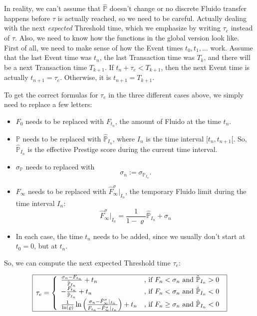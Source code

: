 \documentclass[a4paper,12pt]{scrartcl}
\newcounter{formula}
\begin{document}
In reality, we can't assume that $\hat{\mathbb{P}}$ doesn't change or no discrete Fluido transfer happens before $\tau$ is actually reached, so we need to be careful. Actually dealing with the next \textit{expected} Threshold time, which we emphasize by writing $\tau_e$ instead of $\tau$. Also, we need to know how the functions in the global version look like. First of all, we need to make sense of how the Event times $t_0, t_1, \ldots$ work. Assume that the last Event time was $t_n$, the last Transaction time was $T_k$, and there will be a next Transaction time $T_{k+1}$. If $t_n + \tau_e < T_{k+1}$, then the next Event time is actually $t_{n+1} = \tau_e$. Otherwise, it is $t_{n+1} = T_{k+1}$.

To get the correct formulas for $\tau_e$ in the three different cases above, we simply need to replace a few letters:
\begin{itemize}
 \item $F_0$ needs to be replaced with $F_{t_n}$, the amount of Fluido at the time $t_n$.
 \item $\mathbb{P}$ needs to be replaced with $\hat{\mathbb{P}}_{I_n}$, where $I_n$ is the time interval $[t_n,t_{n+1}[$. So, $\hat{\mathbb{P}}_{I_n}$ is the effective Prestige score during the current time interval.
 \item $\sigma_{\mathbb{P}}$ needs to replaced with
 $$\sigma_n := \sigma_{\mathbb{P}_{I_n}}.$$
 \item $F_{\infty}$ needs to be replaced with $\hat{F}^{\sigma}_{\infty}|_{I_n}$, the temporary Fluido limit during the time interval $I_n$:
 $$\hat{F}^{\sigma}_{\infty}|_{I_n} = \frac{1}{1-\varrho} \hat{\mathbb{P}}_{I_n} + \sigma_n$$
 \item In each case, the time $t_n$ needs to be added, since we usually don't start at $t_0 = 0$, but at $t_n$.
\end{itemize}

So, we can compute the next expected Threshold time $\tau_e$:

$$
\begin{array}{|l|}
\hline
\tau_e = \left\{
\begin{array}{ll}
\frac{\sigma_n - F_{t_n}}{\hat{\mathbb{P}}_{I_n}} + t_n & \mbox{, if } F_n < \sigma_n \mbox{ and } \hat{\mathbb{P}}_{I_n} > 0 \\
-\frac{F_{t_n}}{\hat{\mathbb{P}}_{I_n}} + t_n & \mbox{, if } F_n < \sigma_n \mbox{ and } \hat{\mathbb{P}}_{I_n} < 0\\
\frac{1}{\ln(\varrho)} \ln \left( \frac{\sigma_n - \hat{F}^{\sigma}_{\infty}|_{I_n}}{F_{t_n}-\hat{F}^{\sigma}_{\infty}|_{I_n}} \right) + t_n & \mbox{, if } F_n \geq \sigma_n \mbox{ and } \hat{\mathbb{P}}_{I_n} < 0
\end{array}\right.\\
\hline
\end{array}
$$
\end{document}
